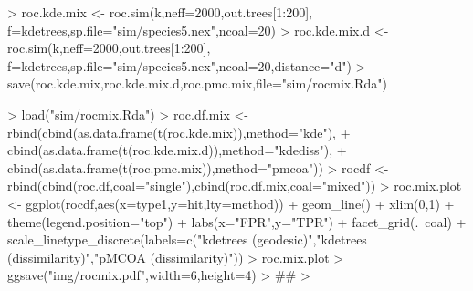 \documentclass{article}
\begin{document}
\begin{Schunk}
\begin{Sinput}
> roc.kde.mix <- roc.sim(k,neff=2000,out.trees[1:200], f=kdetrees,sp.file="sim/species5.nex",ncoal=20)
> roc.kde.mix.d <- roc.sim(k,neff=2000,out.trees[1:200], f=kdetrees,sp.file="sim/species5.nex",ncoal=20,distance="d")
> save(roc.kde.mix,roc.kde.mix.d,roc.pmc.mix,file="sim/rocmix.Rda")
\end{Sinput}
\end{Schunk}
\begin{Schunk}
\begin{Sinput}
> load("sim/rocmix.Rda")
> roc.df.mix <- rbind(cbind(as.data.frame(t(roc.kde.mix)),method="kde"), 
+                     cbind(as.data.frame(t(roc.kde.mix.d)),method="kdediss"),
+                     cbind(as.data.frame(t(roc.pmc.mix)),method="pmcoa"))
> rocdf <- rbind(cbind(roc.df,coal="single"),cbind(roc.df.mix,coal="mixed"))
> roc.mix.plot <- ggplot(rocdf,aes(x=type1,y=hit,lty=method)) + geom_line() + xlim(0,1) + theme(legend.position="top") + labs(x="FPR",y="TPR") + facet_grid(.~coal) + scale_linetype_discrete(labels=c("kdetrees (geodesic)","kdetrees (dissimilarity)","pMCOA (dissimilarity)"))
> roc.mix.plot
> ggsave("img/rocmix.pdf",width=6,height=4)
>  ##
> 
\end{Sinput}
\end{Schunk}
\end{document}
